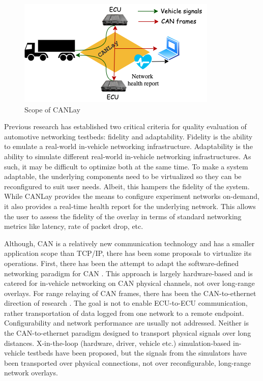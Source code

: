 \documentclass[letterpaper,twocolumn,12pt]{article}
\begin{document}
\begin{figure}[t!]
    \centering
    \includegraphics[width=\linewidth]{images/design_goal.drawio.png}
    \caption{Scope of CANLay}
    \label{fig:goal}
\end{figure}

Previous research \cite{tagarev_automotive_2021} has established two critical criteria for quality evaluation of automotive networking testbeds: fidelity and adaptability. Fidelity is the ability to emulate a real-world in-vehicle networking infrastructure. Adaptability is the ability to simulate different real-world in-vehicle networking infrastructures. As such, it may be difficult to optimize both at the same time. To make a system adaptable, the underlying components need to be virtualized so they can be reconfigured to suit user needs. Albeit, this hampers the fidelity of the system. While CANLay provides the means to configure experiment networks on-demand, it also provides a real-time health report for the underlying network. This allows the user to assess the fidelity of the overlay in terms of standard networking metrics like latency, rate of packet drop, etc.

Although, CAN is a relatively new communication technology and has a smaller application scope than TCP/IP, there has been some proposals to virtualize its operations. 
First, there has been the attempt to adapt the software-defined networking paradigm for CAN \cite{rotermund_requirements_2020,doering_retrofitting_nodate,grewe_bloomycan_2021}. This approach is largely hardware-based and is catered for in-vehicle networking on CAN physical channels, not over long-range overlays. For range relaying of CAN frames, there has been the CAN-to-ethernet direction of research \cite{johanson_relaying_2009,florian_polzlbauer_experience_2019}. The goal is not to enable ECU-to-ECU communication, rather transportation of data logged from one network to a remote endpoint. Configurability and network performance are usually not addressed. Neither is the CAN-to-ethernet paradigm designed to transport physical signals over long distances. 
X-in-the-loop (hardware, driver, vehicle etc.) simulation-based in-vehicle testbeds \cite{appel_safety_2020} have been proposed, but the signals from the simulators have been transported over physical connections, not over reconfigurable, long-range network overlays. 
\end{document}
